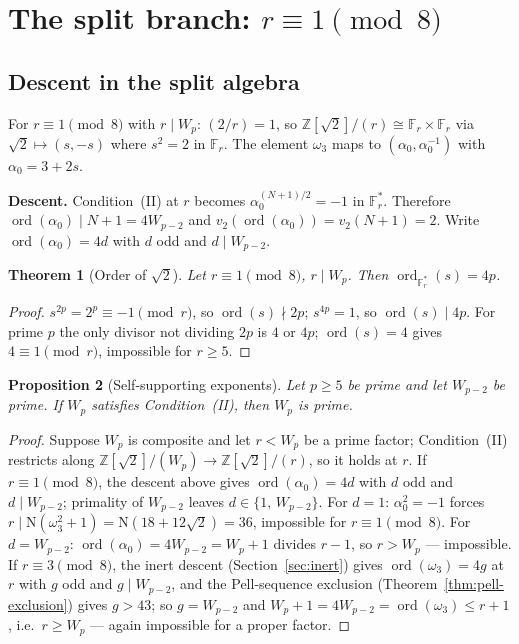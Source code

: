 \documentclass[11pt]{amsart}
\theoremstyle{plain}
\newtheorem{theorem}{Theorem}[section]
\newtheorem{proposition}[theorem]{Proposition}
\theoremstyle{definition}
\theoremstyle{remark}
\numberwithin{equation}{section}
\newcommand{\ord}{\operatorname{ord}}
\newcommand{\Z}{\mathbb{Z}}
\newcommand{\F}{\mathbb{F}}
\begin{document}
\section{The split branch: \texorpdfstring{$r \equiv 1 \pmod 8$}{r = 1 mod 8}}\label{sec:split}

\subsection{Descent in the split algebra}

For $r \equiv 1 \pmod 8$ with $r \mid W_p$: $(2/r) = 1$, so $\Z[\sqrt 2]/(r) \cong \F_r \times \F_r$ via $\sqrt 2 \mapsto (s, -s)$ where $s^2 = 2$ in $\F_r$. The element $\omega_3$ maps to $(\alpha_0, \alpha_0^{-1})$ with $\alpha_0 = 3 + 2 s$.

\textbf{Descent.} Condition~(II) at $r$ becomes $\alpha_0^{(N+1)/2} = -1$ in $\F_r^\ast$. Therefore $\ord(\alpha_0) \mid N + 1 = 4 W_{p-2}$ and $v_2(\ord(\alpha_0)) = v_2(N + 1) = 2$. Write $\ord(\alpha_0) = 4 d$ with $d$ odd and $d \mid W_{p-2}$.

\begin{theorem}[Order of $\sqrt 2$]\label{thm:ord-sqrt2}
Let $r \equiv 1 \pmod 8$, $r \mid W_p$. Then $\ord_{\F_r^\ast}(s) = 4p$.
\end{theorem}

\begin{proof}
$s^{2p} = 2^p \equiv -1 \pmod r$, so $\ord(s) \nmid 2p$; $s^{4p} = 1$, so $\ord(s) \mid 4p$. For prime $p$ the only divisor not dividing $2p$ is $4$ or $4p$; $\ord(s) = 4$ gives $4 \equiv 1 \pmod r$, impossible for $r \geq 5$.
\end{proof}

\begin{proposition}[Self-supporting exponents]\label{prop:ladder}
Let $p \geq 5$ be prime and let $W_{p-2}$ be prime. If $W_p$ satisfies Condition~(II), then $W_p$ is prime.
\end{proposition}

\begin{proof}
Suppose $W_p$ is composite and let $r < W_p$ be a prime factor; Condition~(II) restricts along $\Z[\sqrt2]/(W_p) \to \Z[\sqrt2]/(r)$, so it holds at $r$. If $r \equiv 1 \pmod 8$, the descent above gives $\ord(\alpha_0) = 4d$ with $d$ odd and $d \mid W_{p-2}$; primality of $W_{p-2}$ leaves $d \in \{1,\, W_{p-2}\}$. For $d = 1$: $\alpha_0^2 = -1$ forces $r \mid \mathrm N(\omega_3^2 + 1) = \mathrm N(18 + 12\sqrt 2) = 36$, impossible for $r \equiv 1 \pmod 8$. For $d = W_{p-2}$: $\ord(\alpha_0) = 4 W_{p-2} = W_p + 1$ divides $r - 1$, so $r > W_p$ --- impossible. If $r \equiv 3 \pmod 8$, the inert descent (Section~\ref{sec:inert}) gives $\ord(\omega_3) = 4g$ at $r$ with $g$ odd and $g \mid W_{p-2}$, and the Pell-sequence exclusion (Theorem~\ref{thm:pell-exclusion}) gives $g > 43$; so $g = W_{p-2}$ and $W_p + 1 = 4 W_{p-2} = \ord(\omega_3) \leq r + 1$, i.e.\ $r \geq W_p$ --- again impossible for a proper factor.
\end{proof}
\end{document}

